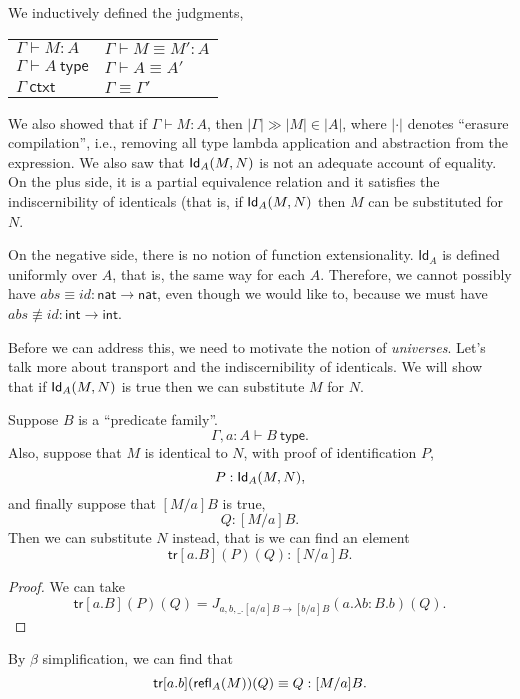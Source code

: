 \documentclass{article} \usepackage{chtt-notes} \usepackage{stmaryrd}
\newcommand{\entails}{\vdash}
\newcommand{\tr}{\textsf{tr}}
\begin{document}
We inductively defined the judgments,
\begin{center}
\begin{tabular}{ll}
  $\Gamma \entails M : A$ &
  $\Gamma \entails M \equiv M' : A$ \\
  $\Gamma \entails A~\textsf{type}$ &
  $\Gamma \entails A \equiv A'$ \\
  $\Gamma~\textsf{ctxt}$ &
  $\Gamma \equiv \Gamma'$
\end{tabular}
\end{center}
We also showed that if $\Gamma \entails M : A$, then $|\Gamma| \gg |M| \in |A|$, where $|\cdot|$ denotes ``erasure compilation'', i.e., removing all type lambda application and abstraction from the expression.
We also saw that $\mathsf{Id}_{A}(M,N)$ is not an adequate account of equality. On the plus side,
it is a partial equivalence relation and it satisfies the indiscernibility of identicals
(that is, if $\mathsf{Id}_{A}(M,N)$ then $M$ can be substituted for $N$.

On the negative side, there is no notion of function extensionality. $\textsf{Id}_A$ is defined
uniformly over $A$, that is, the same way for each $A$. Therefore,
we cannot possibly have
$abs \equiv id : \textsf{nat} \to \textsf{nat}$, even though we would like to,
because we must have
$abs \not\equiv id : \textsf{int} \to \textsf{int}$.

Before we can address this, we need to motivate the notion of \emph{universes}. Let's talk
more about transport and the indiscernibility of identicals. We will show that
if $\mathsf{Id}_{A}(M,N)$ is true then we can substitute $M$ for $N$.

\begin{theorem*}[Transport]
  Suppose $B$ is a ``predicate family''.
  \[ \Gamma, a:A \entails B~\textsf{type}. \]
  Also, suppose that $M$ is identical to $N$, with proof of identification $P$,
  \[ P : \mathsf{Id}_{A}(M,N), \]
  and finally suppose that $[M/a]B$ is true,
  \[ Q : [M/a]B. \]
  Then we can substitute $N$ instead, that is we can find an element
  \[ \tr[a.B](P)(Q) : [N/a]B. \]
\end{theorem*}
\begin{proof}
  We can take
  \[
    \tr[a.B](P)(Q) = J_{a,b,\_. [a/a]B \to [b/a]B}(a.\lambda b:B . b)(Q).
  \]
\end{proof}
\begin{remark}
  By $\beta$ simplification, we can find that
  \[
    \tr[a.b](\refl{A}{M})(Q) \equiv Q : [M/a]B.
  \]
\end{remark}
\end{document}
